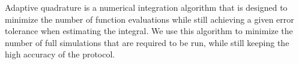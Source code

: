 Adaptive quadrature is a numerical integration algorithm that is designed to
minimize the number of function evaluations while still achieving a given error
tolerance when estimating the integral. We use this algorithm to minimize the
number of full simulations that are required to be run, while still keeping the
high accuracy of the protocol.





